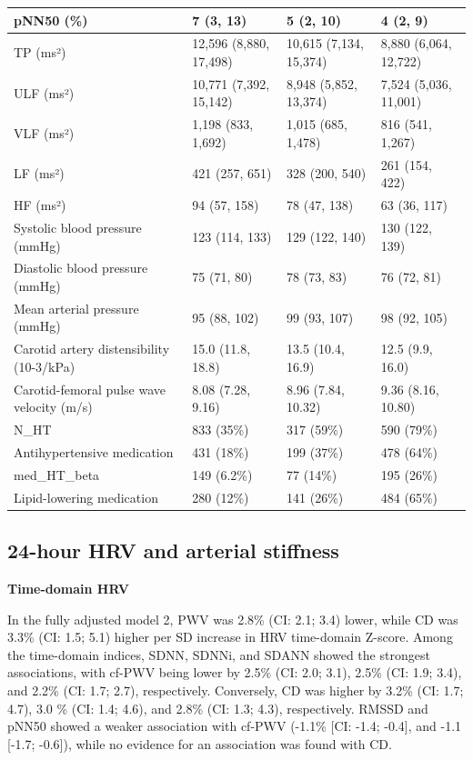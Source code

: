 \documentclass[
  a4paper,
  headsepline=true,
  open=any]{scrbook}
\begin{document}
\begin{table}
\begin{tabular}{l|l|l|l}
\hline
pNN50 (\%) & 7 (3, 13) & 5 (2, 10) & 4 (2, 9)\\
\hline
TP (ms²) & 12,596 (8,880, 17,498) & 10,615 (7,134, 15,374) & 8,880 (6,064, 12,722)\\
\hline
ULF (ms²) & 10,771 (7,392, 15,142) & 8,948 (5,852, 13,374) & 7,524 (5,036, 11,001)\\
\hline
VLF (ms²) & 1,198 (833, 1,692) & 1,015 (685, 1,478) & 816 (541, 1,267)\\
\hline
LF (ms²) & 421 (257, 651) & 328 (200, 540) & 261 (154, 422)\\
\hline
HF (ms²) & 94 (57, 158) & 78 (47, 138) & 63 (36, 117)\\
\hline
Systolic blood pressure (mmHg) & 123 (114, 133) & 129 (122, 140) & 130 (122, 139)\\
\hline
Diastolic blood pressure (mmHg) & 75 (71, 80) & 78 (73, 83) & 76 (72, 81)\\
\hline
Mean arterial pressure (mmHg) & 95 (88, 102) & 99 (93, 107) & 98 (92, 105)\\
\hline
Carotid artery distensibility (10-3/kPa) & 15.0 (11.8, 18.8) & 13.5 (10.4, 16.9) & 12.5 (9.9, 16.0)\\
\hline
Carotid-femoral pulse wave velocity (m/s) & 8.08 (7.28, 9.16) & 8.96 (7.84, 10.32) & 9.36 (8.16, 10.80)\\
\hline
N\_HT & 833 (35\%) & 317 (59\%) & 590 (79\%)\\
\hline
Antihypertensive medication & 431 (18\%) & 199 (37\%) & 478 (64\%)\\
\hline
med\_HT\_beta & 149 (6.2\%) & 77 (14\%) & 195 (26\%)\\
\hline
Lipid-lowering medication & 280 (12\%) & 141 (26\%) & 484 (65\%)\\
\hline
\end{tabular}
\end{table}

\hypertarget{hour-hrv-and-arterial-stiffness}{%
\subsection{24-hour HRV and arterial
stiffness}\label{hour-hrv-and-arterial-stiffness}}

\textbf{Time-domain HRV}

In the fully adjusted model 2, PWV was 2.8\% (CI: 2.1; 3.4) lower, while
CD was 3.3\% (CI: 1.5; 5.1) higher per SD increase in HRV time-domain
Z-score. Among the time-domain indices, SDNN, SDNNi, and SDANN showed
the strongest associations, with cf-PWV being lower by 2.5\% (CI: 2.0;
3.1), 2.5\% (CI: 1.9; 3.4), and 2.2\% (CI: 1.7; 2.7), respectively.
Conversely, CD was higher by 3.2\% (CI: 1.7; 4.7), 3.0 \% (CI: 1.4;
4.6), and 2.8\% (CI: 1.3; 4.3), respectively. RMSSD and pNN50 showed a
weaker association with cf-PWV (-1.1\% {[}CI: -1.4; -0.4{]}, and -1.1
{[}-1.7; -0.6{]}), while no evidence for an association was found with
CD.
\end{document}
